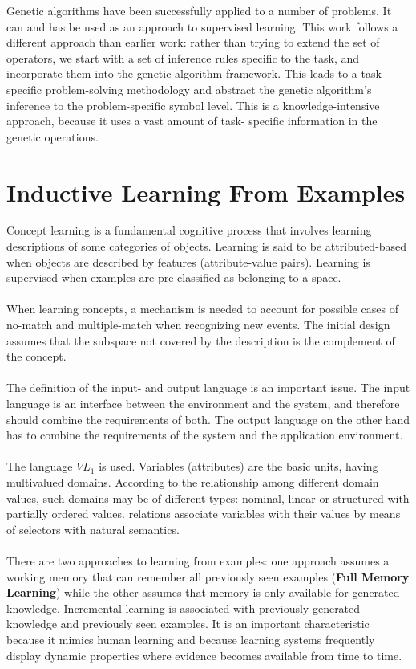 \documentclass[../main.tex]{subfiles}
\begin{document}
Genetic algorithms have been successfully applied to a number of problems. It can and has be used as an approach to
supervised learning. This work follows a different approach than earlier work: rather than trying to extend the set of
operators, we start with a set of inference rules specific to the task, and incorporate them into the genetic algorithm
framework. This leads to a  task-specific problem-solving methodology and abstract the genetic algorithm's inference to
the problem-specific symbol level. This is a knowledge-intensive approach, because it uses a vast amount of task-
specific information in the genetic operations.

\section{Inductive Learning From Examples}
Concept learning is a fundamental cognitive process that involves learning descriptions
of some categories of objects.  Learning is said to be attributed-based when objects are described by features
(attribute-value pairs). Learning is supervised when examples are pre-classified as belonging to a space.
\\\\
When learning concepts, a mechanism is needed to account for possible cases of no-match and multiple-match when
recognizing new events. The initial design assumes that the subspace not covered by the description is the complement
of the concept.
\\\\
The definition of the input- and output language is an important issue. The input language is an interface between the
environment and the system, and therefore should combine the requirements of both. The output language on the other
hand has to combine the requirements of the system and the application environment.
\\\\
The language $VL_1$ is used. Variables (attributes) are the basic units, having multivalued domains. According to the
relationship among different domain values, such domains may be of different types: nominal, linear or structured with
partially ordered values. relations associate variables with their values by means of selectors with natural semantics.
\\\\
There are two approaches to learning from examples: one approach assumes a working memory that can remember all
previously seen examples (\textbf{Full Memory Learning}) while the other assumes that memory is only available for
generated knowledge. Incremental learning is associated with previously generated knowledge and previously seen
examples. It is an important characteristic because it mimics human learning and because learning systems frequently
display dynamic properties where evidence becomes available from time to time.
\end{document}
